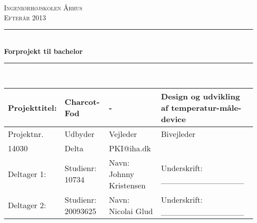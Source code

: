\newcommand{\HRule}{\rule{\linewidth}{0.5mm}} %

\begin{center} %
 

\textsc{\LARGE Ingeniørhøjskolen Århus}\\[1.5cm] %
\textsc{\large Efterår 2013}\\[0.5cm] %


\HRule \\[0.4cm]
{ \huge \bfseries Forprojekt til bachelor}\\[0.4cm] %
\HRule \\[1.5cm]
 

\begin{table}[H]
    \begin{tabular}{|l|l|l|p{4cm}|}
    \hline
    Projekttitel: & Charcot-Fod &- &Design og udvikling af temperatur-måle-device                              \\ \hline
    Projektnr.   & Udbyder                                                     & Vejleder                & Bivejleder                     \\ \hline
    14030        & Delta                                                       & PKI@iha.dk              & ~                              \\ \hline
    Deltager 1:  & Studienr: 10734                                             & Navn: Johnny Kristensen & Underskrift: \_\_\_\_\_\_\_\_\_\_\_\_\_\_ \\ \hline
    Deltager 2:  & Studienr: 20093625                                          & Navn: Nicolai Glud      & Underskrift: \_\_\_\_\_\_\_\_\_\_\_\_\_\_ \\ \hline
    \end{tabular}


\end{table}
\end{center}
